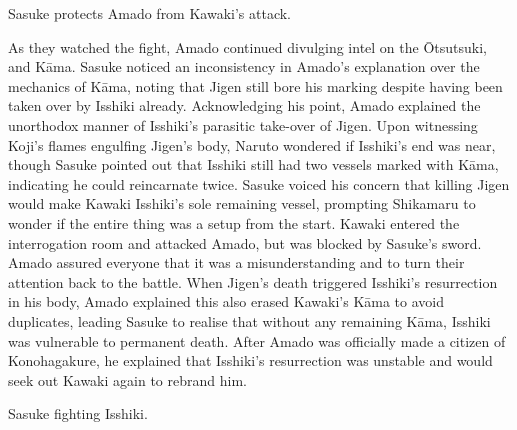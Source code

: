 \documentclass[a4paper,12pt]{article}
\begin{document}
Sasuke protects Amado from Kawaki's attack.\\ \par \vspace{0.5cm}

As they watched the fight, Amado continued divulging intel on the Ōtsutsuki, and Kāma. Sasuke noticed an inconsistency in Amado's explanation over the mechanics of Kāma, noting that Jigen still bore his marking despite having been taken over by Isshiki already. Acknowledging his point, Amado explained the unorthodox manner of Isshiki's parasitic take-over of Jigen. Upon witnessing Koji's flames engulfing Jigen's body, Naruto wondered if Isshiki's end was near, though Sasuke pointed out that Isshiki still had two vessels marked with Kāma, indicating he could reincarnate twice. Sasuke voiced his concern that killing Jigen would make Kawaki Isshiki's sole remaining vessel, prompting Shikamaru to wonder if the entire thing was a setup from the start. Kawaki entered the interrogation room and attacked Amado, but was blocked by Sasuke's sword. Amado assured everyone that it was a misunderstanding and to turn their attention back to the battle. When Jigen's death triggered Isshiki's resurrection in his body, Amado explained this also erased Kawaki's Kāma to avoid duplicates, leading Sasuke to realise that without any remaining Kāma, Isshiki was vulnerable to permanent death. After Amado was officially made a citizen of Konohagakure, he explained that Isshiki's resurrection was unstable and would seek out Kawaki again to rebrand him.\\ \par \vspace{0.5cm}

Sasuke fighting Isshiki.\\ \par \vspace{0.5cm}
\end{document}
